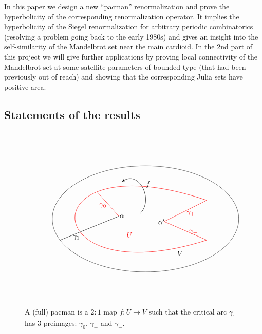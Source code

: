 \documentclass[]{amsart}
\theoremstyle{remark}
\numberwithin{equation}{section}
\theoremstyle{definition}
\begin{document}
In this paper we design a new ``pacman'' renormalization  and prove the hyperbolicity of the corresponding renormalization operator. It 
implies the hyperbolicity of the Siegel renormalization for arbitrary periodic combinatorics  (resolving a  problem going back to the early 1980s) and gives an insight into the self-similarity of the Mandelbrot set near the main cardioid. In the 2nd part of this project \cite{DL} we will give further applications  by 
proving local connectivity of the Mandelbrot set at some satellite parameters of bounded type (that had been previously out of reach) and  showing that the corresponding  Julia sets have positive area. 


\subsection{Statements of the results}


\begin{figure}[t!]
\[\begin{tikzpicture}[scale=1.3]

\coordinate  (w0) at (-3.9,1.5);

\node (v0) at (-2.9,1.4)  {};

\draw  (v0) ellipse (3.5 and 2);




\node[shift={(0.15,0)}]  at (w0)  {$\alpha$};


\coordinate (v1) at (-2.2,1.3) {};
\coordinate (v2) at (-0.6,2.1) {} {};
\coordinate (v3) at (-0.6,0.6) {} {};

  \draw[ line width=0.5pt,red] 
            (v3) 
            .. controls (v3) and (v1) ..
            (v1)
            .. controls (v1) and (v2) ..
            (v2)
            .. controls (-7.3,4.4) and (-7.1,-1.5) ..
            (v3);
            


\coordinate (w1) at (-4.7,2.4) {} {};

\draw[line width=0.5pt,red]  (w0)--(w1);

\coordinate (w2) at (-6.1,0.6)  {};
\draw  [line width=0.5pt]  (w0)--(w2);

\draw[line  width=0.5pt,-latex] (-3.1,1.6) .. controls (-2.6,2.1) and (-3.1,3.2) .. (-3.8,2.8);

\node at (-5.5,0.7) {$\gamma_1$};
\node at (-2.8,2.7) {$f$};
\node[red] at (-4.5,1.9) {$\gamma_0$};

\node[red] at (-1.2,1.6) {$\gamma_+$};
\node[red] at (-1.1,0.9) {$\gamma_-$};
\node at (-1.9,4.6) {};
\node[red] at (-3.5,0.8) {$U$};
\node at (-1.6,0.1) {$V$};
\node at (-2.3,1.3) {$\alpha'$};
\end{tikzpicture}\]
\caption{A (full) pacman is a $2:1$ map $f:U
\to V$ such that the critical arc $\gamma_1$ has $3$ preimages: $\gamma_0$, $\gamma_+$ and $\gamma_-$. }
\label{Fg:Pacman}
\end{figure}
\end{document}
